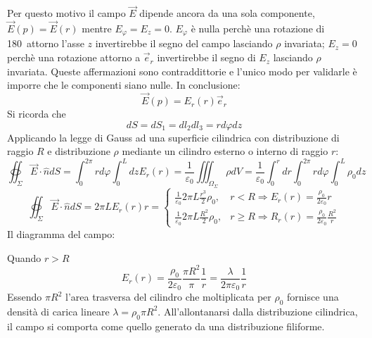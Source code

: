 Per questo motivo il campo $\vec{E}$ dipende ancora da una sola componente, $\vec{E}(p) = \vec{E}(r)$
mentre $E_\varphi = E_z = 0$. $E_\varphi$ è nulla perchè una rotazione di 180\textdegree\ attorno
l'asse $z$ invertirebbe il segno del campo lasciando $\rho$ invariata; $E_z = 0$ perchè una rotazione
attorno a $\vec{e}_r$ invertirebbe il segno di $E_z$ lasciando $\rho$ invariata.
Queste affermazioni sono contraddittorie e l'unico modo per validarle è imporre che le componenti
siano nulle. In conclusione:
$$
\vec{E}(p) = E_r(r)\vec{e}_r
$$
Si ricorda che
$$
dS = dS_1 = dl_2 dl_3 = rd\varphi dz
$$
Applicando la legge di Gauss ad una superficie cilindrica con distribuzione di raggio $R$ e distribuzione $\rho$ mediante un cilindro esterno o interno di raggio $r$:
$$
\oiint_\Sigma\vec{E}\cdot\hat{n}dS = \int_0^{2\pi}rd\varphi \int_0^L dz E_r(r) = \frac{1}{\varepsilon_0}
\iiint_{\Omega_\Sigma}\rho dV = \frac{1}{\varepsilon_0} \int_{0}^{r}dr\int_{0}^{2\pi} rd\varphi\int_0^L \rho_0 dz 
$$
$$
\oiint_\Sigma\vec{E}\cdot\hat{n}dS = 2\pi L E_r(r) r =
\begin{cases}
\frac{1}{\varepsilon_0} 2 \pi L \frac{r^3}{2}\rho_0, & r < R \Rightarrow E_r(r) = \frac{\rho_0}{2\varepsilon_0}r\\
\frac{1}{\varepsilon_0} 2 \pi L \frac{R^2}{2}\rho_0, & r\geq R \Rightarrow R_r(r) = \frac{\rho_0}{2\varepsilon_0} \frac{R^2}{r}
\end{cases}
$$
Il diagramma del campo:
\begin{center} %
\end{center}

Quando $r > R$ 
$$
E_r(r) = \frac{\rho_0}{2\varepsilon_0} \frac{\pi R^2}{\pi} \frac{1}{r} = 
\frac{\lambda}{2\pi\varepsilon_0} \frac{1}{r}
$$
Essendo $\pi R^2$ l'area trasversa del cilindro che moltiplicata per $\rho_0$ fornisce una densità di
carica lineare $\lambda = \rho_0 \pi R^2$. All'allontanarsi dalla distribuzione cilindrica, il campo si
comporta come quello generato da una distribuzione filiforme.

